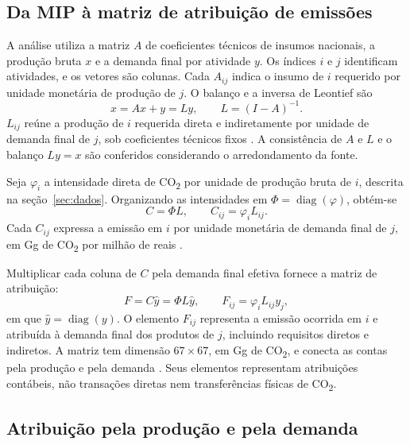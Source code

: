 \subsection{Da MIP à matriz de atribuição de emissões}
\label{sec:derivacao}

A análise utiliza a matriz $A$ de coeficientes técnicos de insumos nacionais, a produção bruta $x$ e a demanda final por atividade $y$. Os índices $i$ e $j$ identificam atividades, e os vetores são colunas. Cada $A_{ij}$ indica o insumo de $i$ requerido por unidade monetária de produção de $j$. O balanço e a inversa de Leontief são
\begin{equation}
x=Ax+y=Ly,\qquad L=(I-A)^{-1}.
\label{eq:leontief}
\end{equation}
$L_{ij}$ reúne a produção de $i$ requerida direta e indiretamente por unidade de demanda final de $j$, sob coeficientes técnicos fixos \parencite{millerBlair2009}. A consistência de $A$ e $L$ e o balanço $Ly=x$ são conferidos considerando o arredondamento da fonte.

Seja $\varphi_i$ a intensidade direta de CO\textsubscript{2} por unidade de produção bruta de $i$, descrita na seção~\ref{sec:dados}. Organizando as intensidades em $\Phi=\operatorname{diag}(\varphi)$, obtém-se
\begin{equation}
C=\Phi L,\qquad C_{ij}=\varphi_iL_{ij}.
\label{eq:coeficientes-emissoes}
\end{equation}
Cada $C_{ij}$ expressa a emissão em $i$ por unidade monetária de demanda final de $j$, em Gg de CO\textsubscript{2} por milhão de reais \parencite{sanguinetAzzoni2024}.

Multiplicar cada coluna de $C$ pela demanda final efetiva fornece a matriz de atribuição:
\begin{equation}
F=C\widehat y=\Phi L\widehat y,\qquad F_{ij}=\varphi_iL_{ij}y_j,
\label{eq:matriz-atribuicao}
\end{equation}
em que $\widehat y=\operatorname{diag}(y)$. O elemento $F_{ij}$ representa a emissão ocorrida em $i$ e atribuída à demanda final dos produtos de $j$, incluindo requisitos diretos e indiretos. A matriz tem dimensão $67\times67$, em Gg de CO\textsubscript{2}, e conecta as contas pela produção e pela demanda \parencite{marques2012}. Seus elementos representam atribuições contábeis, não transações diretas nem transferências físicas de CO\textsubscript{2}.

\subsection{Atribuição pela produção e pela demanda}
\label{sec:atribuicoes}

